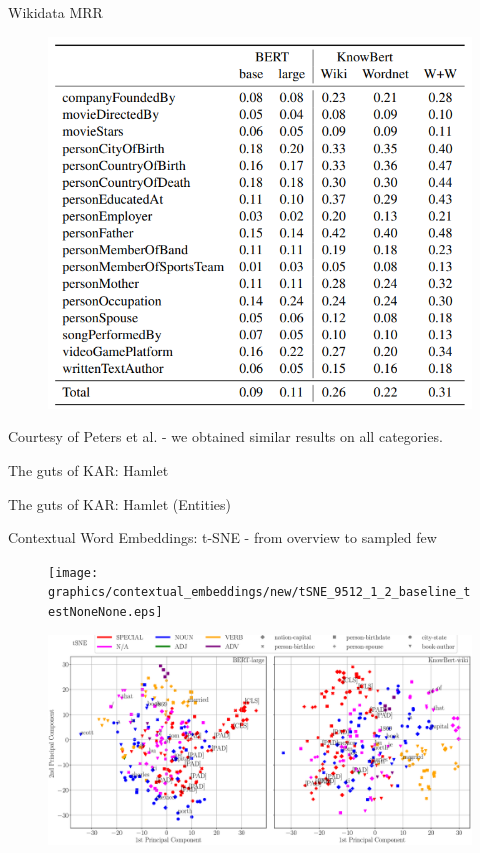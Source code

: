 \begin{frame}{Wikidata MRR}
    \begin{figure}
        \centering
        \includegraphics[height=0.8\textheight]{graphics/kb/wikidata_mrr.PNG}
    \end{figure}
    Courtesy of Peters et al. - we obtained similar results on all categories.
\end{frame}


\begin{frame}{The guts of KAR: Hamlet}
\end{frame}
\begin{frame}{The guts of KAR: Hamlet (Entities)}
    
\end{frame}

\begin{frame}{Contextual Word Embeddings: t-SNE - from overview to sampled few}
    \begin{figure}
        \centering
        \texttt{[image: graphics/contextual\_embeddings/new/tSNE\_9512\_1\_2\_baseline\_testNoneNone.eps]}
    \end{figure}
    \begin{figure}
        \centering
        \includegraphics[height=0.78\textheight]{graphics/contextual_embeddings/new/tSNE_250_1_2_baseline_test_annotatedNone.eps}
    \end{figure}
\end{frame}

